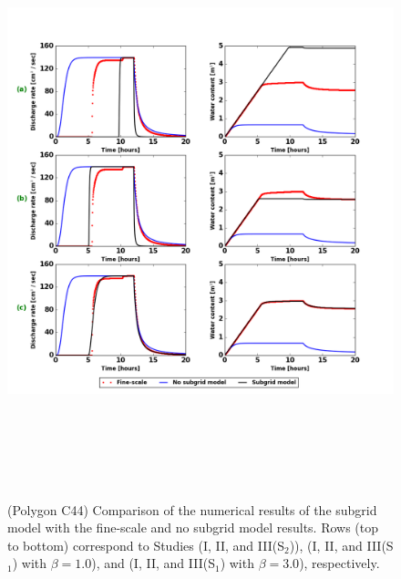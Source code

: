 \begin{figure}
\centering
\includegraphics[width=13.cm, height=17.2cm]{./figures/new-model/POLYGON44-combined.png}
\caption{(Polygon C44) Comparison of the numerical results of the subgrid model with the fine-scale and no subgrid model results. Rows (top to bottom) correspond to Studies (I, II, and III(S$_2$)), (I, II, and III(S$_1$) with $\beta = 1.0$), and (I, II, and III(S$_1$) with $\beta = 3.0$), respectively.}
\label{polygon-C44}
\end{figure}

